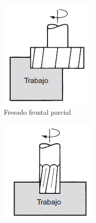 \begin{figure}[hbt]
\begin{subfigure}{0.25\textwidth}
        \centering
        \includegraphics[width=0.9\linewidth]{Cap1_FormulaciondelProyecto/Figuras/b.PNG}
        \caption{Fresado frontal parcial}
        \label{fig:FresadoFP}
    \end{subfigure}
    \begin{subfigure}{0.25\textwidth}
        \centering
        \includegraphics[width=0.9\linewidth]{Cap1_FormulaciondelProyecto/Figuras/c.PNG}

\end{subfigure}
\end{figure}
